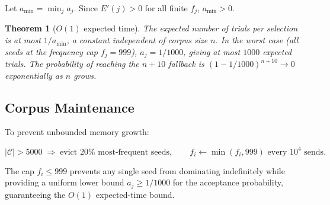 \documentclass[11pt,a4paper]{article}
\newtheorem{theorem}{Theorem}
\begin{document}
Let $a_{\min} = \min_j a_j$. Since $E'(j) > 0$ for all finite $f_j$,
$a_{\min} > 0$.

\begin{theorem}[$O(1)$ expected time]
The expected number of trials per selection is at most $1 / a_{\min}$, a
constant independent of corpus size $n$. In the worst case (all seeds at the
frequency cap $f_j = 999$), $a_j = 1/1000$, giving at most $1000$ expected
trials. The probability of reaching the $n+10$ fallback is
$(1 - 1/1000)^{n+10} \to 0$ exponentially as $n$ grows.
\end{theorem}

\subsection{Corpus Maintenance}

To prevent unbounded memory growth:

\[
|\mathcal{C}| > 5000 \;\Longrightarrow\; \text{evict } 20\% \text{ most-frequent seeds},
\qquad
f_i \gets \min(f_i, 999) \text{ every } 10^4 \text{ sends}.
\]

The cap $f_i \leq 999$ prevents any single seed from dominating
indefinitely while providing a uniform lower bound $a_j \geq 1/1000$ for
the acceptance probability, guaranteeing the $O(1)$ expected-time bound.
\end{document}
